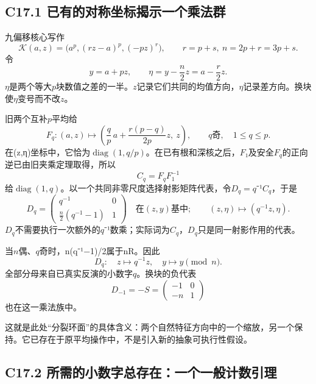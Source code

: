 \subsection*{\texorpdfstring{{C17.1} {已有的对称坐标揭示一个乘法群}}{C17.1 已有的对称坐标揭示一个乘法群}}\label{C17-h123}

{九偏移核心写作} \[
\mathcal K(a,z)=
\bigl(a^p,(rz-a)^p,(-pz)^r\bigr),
\qquad r=p+s,\ n=2p+r=3p+s.
\] {令} \[
y=a+pz,\qquad \eta=y-\frac n2z=a-\frac r2z.
\tag{C17.1.1}
\] {\ensuremath{\eta }是两个等大\ensuremath{p}块数值之差的一半。\ensuremath{z}记录它们共同的均值方向，\ensuremath{\eta }记录差方向。换块使\ensuremath{\eta }变号而不改\ensuremath{z}。}

{旧两个互补\ensuremath{p}平均给} \[
F_q:
(a,z)\longmapsto
\left(\frac qp\,a+\frac{r(p-q)}{2p}z,\ z\right),
\qquad q\text{奇},\quad1\le q\le p.
\] {在(z,η)坐标中，它恰为\ensuremath{\operatorname{diag}(1,q/p)}。在已有根和深核之后，\ensuremath{F}₁及安全\ensuremath{F_{q}}的正向逆已由旧夹乘定理取得，所以} \[
C_q=F_qF_1^{-1}
\] {给\ensuremath{\operatorname{diag}(1,q)}。以一个共同非零尺度选择射影矩阵代表，令\ensuremath{D_{q}=q}⁻¹\ensuremath{C_{q}}，于是} \[
\boxed{
D_q=\begin{pmatrix}
q^{-1}&0\\
\frac n2(q^{-1}-1)&1
\end{pmatrix}
\quad\text{在}(z,y)\text{基中};
\qquad
(z,\eta)\mapsto(q^{-1}z,\eta).
}
\tag{C17.1.2}
\] {\ensuremath{D_{q}}不需要执行一次额外的\ensuremath{q}⁻¹数乘；实际词为\ensuremath{C_{q}}，\ensuremath{D_{q}}只是同一射影作用的代表。}

{当\ensuremath{n}偶、\ensuremath{q}奇时，n(q⁻¹−1)/2属于nR。因此} \[
\boxed{D_q:\quad z\mapsto q^{-1}z,\quad y\mapsto y\pmod n.}
\tag{C17.1.3}
\] {全部分母来自已真实反演的小数字\ensuremath{q}。换块的负代表} \[
D_{-1}=-S=\begin{pmatrix}-1&0\\-n&1\end{pmatrix}
\] {也在这一乘法族中。}

{这就是此处``分裂环面''的具体含义：两个自然特征方向中的一个缩放，另一个保持。它已存在于原平均操作中，不是引入新的抽象可执行性假设。}

\subsection*{\texorpdfstring{{C17.2} {所需的小数字总存在：一个一般计数引理}}{C17.2 所需的小数字总存在：一个一般计数引理}}\label{C17-h124}

